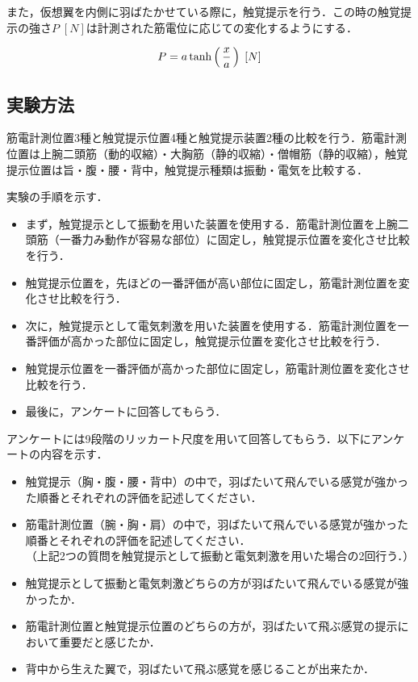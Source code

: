 \begin{small}
        また，仮想翼を内側に羽ばたかせている際に，触覚提示を行う．この時の触覚提示の強さ$P\;[N]$は計測された筋電位に応じての変化するようにする．
        
        \begin{eqnarray}
                \equlabel{haptics}
                P=a \tanh\left(\,\frac{x}{a}\,\right) \;[N]
        \end{eqnarray}
        
  \subsection{実験方法}
        筋電計測位置3種と触覚提示位置4種と触覚提示装置2種の比較を行う．筋電計測位置は上腕二頭筋（動的収縮）・大胸筋（静的収縮）・僧帽筋（静的収縮），触覚提示位置は旨・腹・腰・背中，触覚提示種類は振動・電気を比較する．

        実験の手順を示す．
        \begin{itemize}
        \item まず，触覚提示として振動を用いた装置を使用する．筋電計測位置を上腕二頭筋（一番力み動作が容易な部位）に固定し，触覚提示位置を変化させ比較を行う．
        \item 触覚提示位置を，先ほどの一番評価が高い部位に固定し，筋電計測位置を変化させ比較を行う．
        \item 次に，触覚提示として電気刺激を用いた装置を使用する．筋電計測位置を一番評価が高かった部位に固定し，触覚提示位置を変化させ比較を行う．
        \item 触覚提示位置を一番評価が高かった部位に固定し，筋電計測位置を変化させ比較を行う．
        \item 最後に，アンケートに回答してもらう．
        \end{itemize}


        アンケートには9段階のリッカート尺度\cite{lickert1932method}を用いて回答してもらう．以下にアンケートの内容を示す．
        \begin{itemize}
        \item 触覚提示（胸・腹・腰・背中）の中で，羽ばたいて飛んでいる感覚が強かった順番とそれぞれの評価を記述してください．
        \item 筋電計測位置（腕・胸・肩）の中で，羽ばたいて飛んでいる感覚が強かった順番とそれぞれの評価を記述してください．\\
        （上記2つの質問を触覚提示として振動と電気刺激を用いた場合の2回行う．）
        \item  触覚提示として振動と電気刺激どちらの方が羽ばたいて飛んでいる感覚が強かったか．
        \item 筋電計測位置と触覚提示位置のどちらの方が，羽ばたいて飛ぶ感覚の提示において重要だと感じたか．
        \item 背中から生えた翼で，羽ばたいて飛ぶ感覚を感じることが出来たか．
        \end{itemize}



\end{small}
